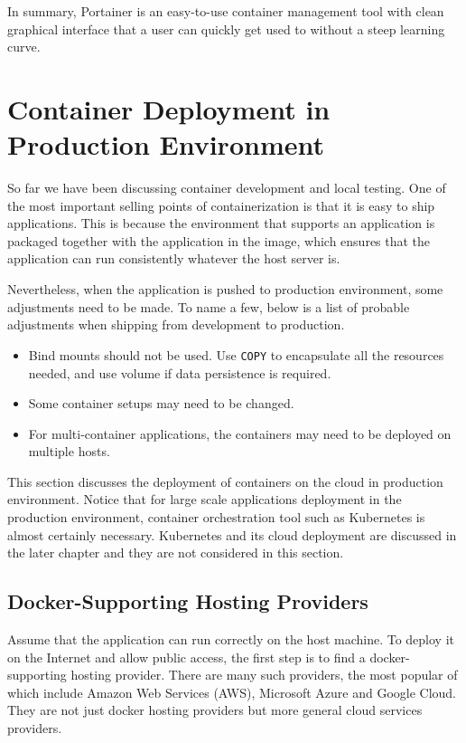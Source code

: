 In summary, Portainer is an easy-to-use container management tool with clean graphical interface that a user can quickly get used to without a steep learning curve.

\section{Container Deployment in Production Environment}

So far we have been discussing container development and local testing. One of the most important selling points of containerization is that it is easy to ship applications. This is because the environment that supports an application is packaged together with the application in the image, which ensures that the application can run consistently whatever the host server is. 

Nevertheless, when the application is pushed to production environment, some adjustments need to be made. To name a few, below is a list of probable adjustments when shipping from development to production.

\begin{itemize}
	\item Bind mounts should not be used. Use \verb|COPY| to encapsulate all the resources needed, and use volume if data persistence is required.
	\item Some container setups may need to be changed.
	\item For multi-container applications, the containers may need to be deployed on multiple hosts.
\end{itemize}

This section discusses the deployment of containers on the cloud in production environment. Notice that for large scale applications deployment in the production environment, container orchestration tool such as Kubernetes is almost certainly necessary. Kubernetes and its cloud deployment are discussed in the later chapter and they are not considered in this section. 

\subsection{Docker-Supporting Hosting Providers}

Assume that the application can run correctly on the host machine. To deploy it on the Internet and allow public access, the first step is to find a docker-supporting hosting provider. There are many such providers, the most popular of which include Amazon Web Services (AWS), Microsoft Azure and Google Cloud. They are not just docker hosting providers but more general cloud services providers.


